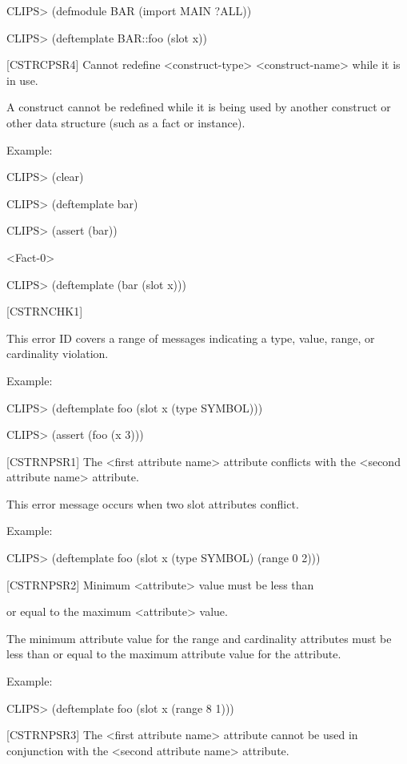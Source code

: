 \documentclass[letterpaper,10pt,english]{sphinxmanual}
\begin{document}
CLIPS\textgreater{} (defmodule BAR (import MAIN ?ALL))

CLIPS\textgreater{} (deftemplate BAR::foo (slot x))

{[}CSTRCPSR4{]} Cannot redefine \textless{}construct-type\textgreater{} \textless{}construct-name\textgreater{} while it
is in use.

A construct cannot be redefined while it is being used by another
construct or other data structure (such as a fact or instance).

Example:

CLIPS\textgreater{} (clear)

CLIPS\textgreater{} (deftemplate bar)

CLIPS\textgreater{} (assert (bar))

\textless{}Fact-0\textgreater{}

CLIPS\textgreater{} (deftemplate (bar (slot x)))

{[}CSTRNCHK1{]} 

This error ID covers a range of messages indicating a type, value,
range, or cardinality violation.

Example:

CLIPS\textgreater{} (deftemplate foo (slot x (type SYMBOL)))

CLIPS\textgreater{} (assert (foo (x 3)))

{[}CSTRNPSR1{]} The \textless{}first attribute name\textgreater{} attribute conflicts with the
\textless{}second attribute name\textgreater{} attribute.

This error message occurs when two slot attributes conflict.

Example:

CLIPS\textgreater{} (deftemplate foo (slot x (type SYMBOL) (range 0 2)))

{[}CSTRNPSR2{]} Minimum \textless{}attribute\textgreater{} value must be less than

or equal to the maximum \textless{}attribute\textgreater{} value.

The minimum attribute value for the range and cardinality attributes
must be less than or equal to the maximum attribute value for the
attribute.

Example:

CLIPS\textgreater{} (deftemplate foo (slot x (range 8 1)))

{[}CSTRNPSR3{]} The \textless{}first attribute name\textgreater{} attribute cannot be used in
conjunction with the \textless{}second attribute name\textgreater{} attribute.
\end{document}
